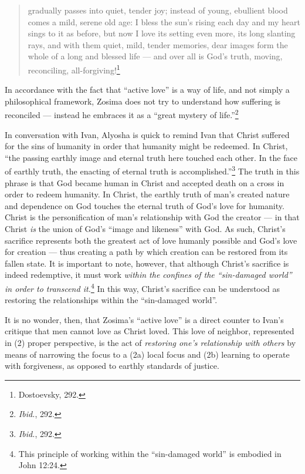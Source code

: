 \begin{quote}
\singlespacing
gradually passes into quiet, tender joy; instead of young, ebullient blood comes a mild, serene old age: I bless the sun's rising each day and my heart sings to it as before, but now I love its setting even more, its long slanting rays, and with them quiet, mild, tender memories, dear images form the whole of a long and blessed life --- and over all is God's truth, moving, reconciling, all-forgiving!\footnote{Dostoevsky, 292.} 
\end{quote} 

In accordance with the fact that ``active love'' is a way of life, and not simply a philosophical framework, Zosima does not try to understand how suffering is reconciled --- instead he embraces it as a ``great mystery of life.''\footnote{\emph{Ibid.}, 292.}

In conversation with Ivan, Alyosha is quick to remind Ivan that Christ suffered for the sins of humanity in order that humanity might be redeemed. In Christ, ``the passing earthly image and eternal truth here touched each other. In the face of earthly truth, the enacting of eternal truth is accomplished.''\footnote{\emph{Ibid.}, 292.} The truth in this phrase is that God became human in Christ and accepted death on a cross in order to redeem humanity. In Christ, the earthly truth of man's created nature and dependence on God touches the eternal truth of God's love for humanity. Christ is the personification of man's relationship with God the creator --- in that Christ \emph{is} the union of God's ``image and likeness'' with God. As such, Christ's sacrifice represents both the greatest act of love humanly possible and God's love for creation --- thus creating a path by which creation can be restored from its fallen state. It is important to note, however, that although Christ's sacrifice is indeed redemptive, it must work \emph{within the confines of the ``sin-damaged world'' in order to transcend it.}\footnote{This principle of working within the ``sin-damaged world'' is embodied in John 12:24.} In this way, Christ's sacrifice can be understood as restoring the relationships within the ``sin-damaged world''. 

It is no wonder, then, that Zosima's ``active love'' is a direct counter to Ivan's critique that men cannot love as Christ loved. This love of neighbor, represented in (2) proper perspective, is the act of \emph{restoring one's relationship with others} by means of narrowing the focus to a (2a) local focus and (2b) learning to operate with forgiveness, as opposed to earthly standards of justice.

